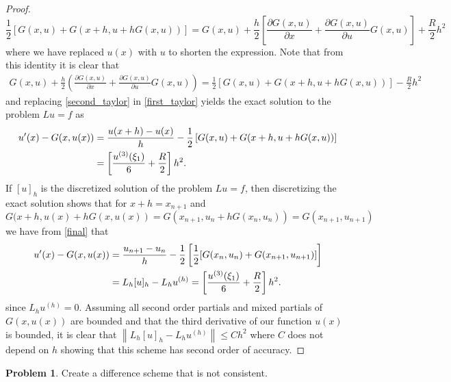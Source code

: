 \documentclass[12pt]{article}
\theoremstyle{definition}
\newtheorem{problem}{Problem}
\newcommand\norm[1]{\left\lVert#1\right\rVert}
\begin{document}
\begin{proof}
  \[
    \frac{1}{2}\left[G(x, u) + G(x + h, u + hG(x, u))\right] = G(x, u) + \frac{h}{2}\left[\frac{\partial G(x, u)}{\partial x} + \frac{\partial G(x, u)}{\partial u}G(x, u)\right] + \frac{R}{2}h^2
  \]
  where we have replaced $u(x)$ with $u$ to shorten the expression. Note that from this identity it is clear that
  \begin{align}\label{second_taylor}
    G(x, u) + \frac{h}{2}\left(\frac{\partial G(x, u)}{\partial x} + \frac{\partial G(x, u)}{\partial u}G(x, u)\right) = \frac{1}{2}\left[G(x, u) + G(x + h, u + hG(x, u))\right] - \frac{R}{2}h^2
  \end{align}
  and replacing \eqref{second_taylor} in \eqref{first_taylor} yields the exact solution to the problem $Lu = f$ as
  \begin{align}\label{final}
    u^{\prime}(x) - G(x, u(x)) &= \frac{u(x+h) - u(x)}{h} - \frac{1}{2}\left[G(x, u) + G(x + h, u + hG(x, u))\right] \\
    &= \left[\frac{u^{(3)}(\xi_1)}{6} +  \frac{R}{2}\right]h^2.\notag
  \end{align}
  If $[u]_h$ is the discretized solution of the problem $Lu =f$, then discretizing
  the exact solution shows that for $x + h = x_{n+1}$ and $G(x+h,u(x)+ h G(x, u(x)) = G(x_{n+1}, u_n + hG(x_n, u_n)) =G(x_{n+1}, u_{n+1})$
  we have from \eqref{final} that
  \begin{align*}
    u^{\prime}(x) - G(x, u(x)) &= \frac{u_{n+1} - u_n}{h} - \frac{1}{2}\left[\frac{1}{2}[G(x_n, u_n) + G(x_{n+1}, u_{n+1})]\right] \\
    &= L_h[u]_h - L_h u^{(h)} =  \left[\frac{u^{(3)}(\xi_1)}{6} +  \frac{R}{2}\right]h^2.\notag
  \end{align*}
  since $L_h u^{(h)} = 0$. Assuming all second order partials and mixed partials of $G(x, u(x))$ are bounded and that the third derivative of our function $u(x)$ is bounded,
  it is clear that $\norm{L_h[u]_h - L_hu^{(h)}} \leq C h^2$ where $C$ does not depend on $h$
  showing that this scheme has second order of accuracy.
\end{proof}


\begin{problem}
  Create a difference scheme that is not consistent.
\end{problem}
\end{document}
